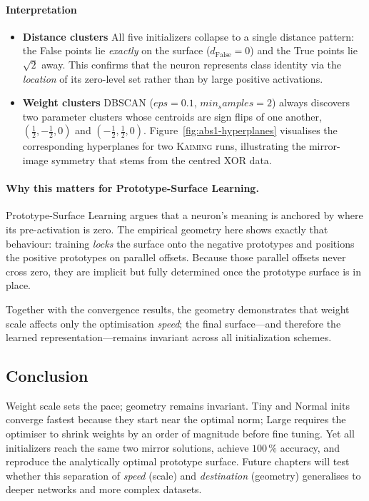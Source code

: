 \paragraph{Interpretation}
\begin{itemize}
  \item \textbf{Distance clusters}  
        All five initializers collapse to a single distance pattern:
        the False points lie \emph{exactly} on the surface
        ($d_{\text{False}}=0$) and the True points lie \(\sqrt2\) away.
        This confirms that the neuron represents class identity via the
        \emph{location} of its zero-level set rather than by large positive
        activations.
  \item \textbf{Weight clusters}  
        DBSCAN ($eps = 0.1$, $min_samples = 2$) always discovers two parameter clusters whose centroids are
        sign flips of one another,
        \((\frac12,-\frac12,0)\) and \((-\frac12,\frac12,0)\).
        Figure~\ref{fig:abs1-hyperplanes} visualises the corresponding
        hyperplanes for two \textsc{Kaiming} runs, illustrating the
        mirror-image symmetry that stems from the centred XOR data.
\end{itemize}

\paragraph{Why this matters for Prototype-Surface Learning.}
Prototype-Surface Learning argues that a neuron's meaning is anchored by
where its pre-activation is zero.  The empirical geometry here shows exactly
that behaviour: training \emph{locks} the surface onto the negative prototypes
and positions the positive prototypes on parallel offsets.  Because those
parallel offsets never cross zero, they are implicit but fully determined once
the prototype surface is in place.

Together with the convergence results, the geometry demonstrates that weight
scale affects only the optimisation \emph{speed}; the final surface—and
therefore the learned representation—remains invariant across all
initialization schemes.

\subsection*{Conclusion}

Weight scale sets the pace; geometry remains invariant.  Tiny and Normal
inits converge fastest because they start near the optimal norm; Large
requires the optimiser to shrink weights by an order of magnitude before fine
tuning.  Yet all initializers reach the same two mirror solutions, achieve
$100\,\%$ accuracy, and reproduce the analytically optimal prototype surface.
Future chapters will test whether this separation of \emph{speed} (scale) and
\emph{destination} (geometry) generalises to deeper networks and more complex
datasets.


